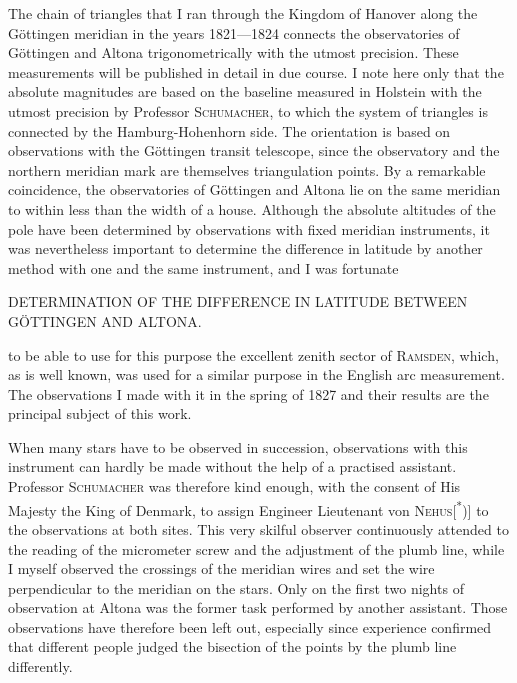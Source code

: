 The chain of triangles that I ran through the Kingdom of Hanover along the Göttingen meridian
in the years 1821---1824 connects the observatories of Göttingen and Altona trigonometrically
with the utmost precision. These measurements will be published in detail in due course.
I note here only that the absolute magnitudes are based on the baseline measured in Holstein
with the utmost precision by Professor \textsc{Schumacher}, to which the system of triangles
is connected by the Hamburg-Hohenhorn side. The orientation is based on observations with the
Göttingen transit telescope, since the observatory and the northern meridian mark are themselves
triangulation points. By a remarkable coincidence, the observatories of Göttingen and Altona
lie on the same meridian to within less than the width of a house. Although the absolute
altitudes of the pole have been determined by observations with fixed meridian instruments,
it was nevertheless important to determine the difference in latitude by another method with
one and the same instrument, and I was fortunate

\clearpage
\noindent{}\parbox[t]{\dimexpr\textwidth-10mm\relax}{\centering\scriptsize DETERMINATION OF THE\,\quotedblbase\,DIFFERENCE IN LATITUDE BETWEEN GÖTTINGEN AND ALTONA.}\par
\noindent to be able to use for this purpose the excellent zenith sector of \textsc{Ramsden},
which, as is well known, was used for a similar purpose in the English arc measurement.
The observations I made with it in the spring of 1827 and their results are the principal
subject of this work.

When many stars have to be observed in succession, observations with this instrument can
hardly be made without the help of a practised assistant. Professor \textsc{Schumacher} was
therefore kind enough, with the consent of His Majesty the King of Denmark, to assign Engineer
Lieutenant von \textsc{Nehus}[\textsuperscript{*})] to the observations at both sites. This very
skilful observer continuously attended to the reading of the micrometer screw and the adjustment
of the plumb line, while I myself observed the crossings of the meridian wires and set the wire
perpendicular to the meridian on the stars. Only on the first two nights of observation at
Altona was the former task performed by another assistant. Those observations have therefore
been left out, especially since experience confirmed that different people judged the bisection
of the points by the plumb line differently.

